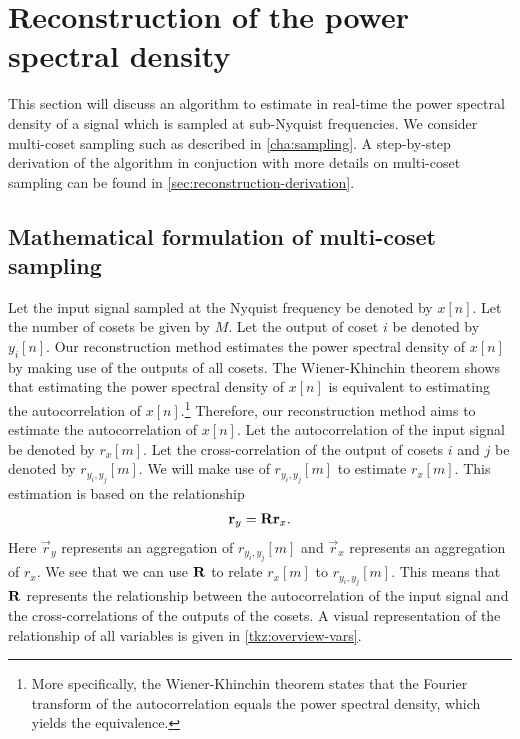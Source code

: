\documentclass[a4paper, openany, oneside]{memoir}
\begin{document}
\section{Reconstruction of the power spectral density}
\label{sec:reconstruction-algorithm}
This section will discuss an algorithm to estimate in real-time the power spectral density of a signal which is sampled at sub-Nyquist frequencies. We consider multi-coset sampling such as described in \cref{cha:sampling}. A step-by-step derivation of the algorithm in conjuction with more details on multi-coset sampling can be found in \cref{sec:reconstruction-derivation}.

\subsection{Mathematical formulation of multi-coset sampling}
Let the input signal sampled at the Nyquist frequency be denoted by $x[n]$. Let the number of cosets be given by $M$. Let the output of coset $i$ be denoted by $y_i[n]$. Our reconstruction method estimates the power spectral density of $x[n]$ by making use of the outputs of all cosets. The Wiener-Khinchin theorem shows that estimating the power spectral density of $x[n]$ is equivalent to estimating the autocorrelation of $x[n]$.\footnote{More specifically, the Wiener-Khinchin theorem states that the Fourier transform of the autocorrelation equals the power spectral density, which yields the equivalence.} Therefore, our reconstruction method aims to estimate the autocorrelation of $x[n]$. Let the autocorrelation of the input signal be denoted by $r_x[m]$. Let the cross-correlation of the output of cosets $i$ and $j$ be denoted by $r_{y_i,y_j}[m]$. We will make use of $r_{y_i,y_j}[m]$ to estimate $r_x[m]$. This estimation is based on the relationship
\begin{align*}
    \boldsymbol{\mathbf{r}}_{y} = \boldsymbol{\mathbf{R}} \boldsymbol{\mathbf{r}}_x.
\end{align*}
Here $\vec{r}_y$ represents an aggregation of $r_{y_i,y_j}[m]$ and $\vec{r}_x$ represents an aggregation of $r_x$. We see that we can use $\boldsymbol{\mathbf{R}}$ to relate $r_x[m]$ to $r_{y_i,y_j}[m]$. This means that $\boldsymbol{\mathbf{R}}$ represents the relationship between the autocorrelation of the input signal and the cross-correlations of the outputs of the cosets. A visual representation of the relationship of all variables is given in \cref{tkz:overview-vars}.
\end{document}
